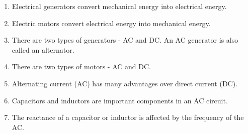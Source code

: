 \begin{enumerate}
\item Electrical generators convert mechanical energy into electrical energy.
\item Electric motors convert electrical energy into mechanical energy.
\item There are two types of generators - AC and DC. An AC generator is also called an alternator.
\item There are two types of motors - AC and DC.
\item Alternating current (AC) has many advantages over direct current (DC).
\item Capacitors and inductors are important components in an AC circuit.
\item The reactance of a capacitor or inductor is affected by the frequency of the AC.
\end{enumerate}

